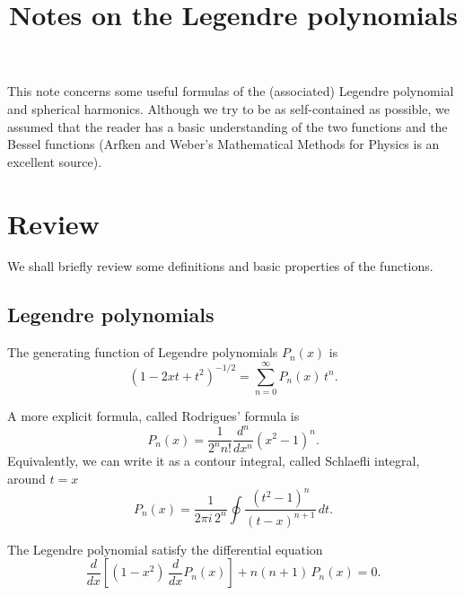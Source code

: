 \documentclass[11pt]{article}
\begin{document}
\title{Notes on the Legendre polynomials}
\author{ \vspace{-10ex} }
\date{ \vspace{-10ex} }
\maketitle


This note concerns some useful formulas of
the (associated) Legendre polynomial
and spherical harmonics.
%
Although we try to be as self-contained as possible,
we assumed that the reader
has a basic understanding of the two functions
and the Bessel functions
(Arfken and Weber's Mathematical Methods for Physics\cite{arfken}
is an excellent source).



\section{Review}



We shall briefly review some definitions and basic properties of the functions.


\subsection{Legendre polynomials}



The generating function of Legendre polynomials $P_n(x)$ is
%
\begin{equation}
  (1 - 2 x t + t^2)^{-1/2}
=
  \sum_{n = 0}^\infty P_n(x) \, t^n.
  \label{eq:legendre_gf}
\end{equation}

A more explicit formula, called Rodrigues' formula is
%
\begin{equation}
  P_n(x)
=
  \frac{1}{2^n n!}
  \frac{d^n}{dx^n}
  (x^2 - 1)^n.
  \label{eq:legendre_rodrigues}
\end{equation}
%
Equivalently, we can write it as a contour integral,
called Schlaefli integral, around $t = x$
\begin{equation}
  P_n(x)
=
  \frac{1}{2\pi i \, 2^n}
  \oint
  \frac{ (t^2 - 1)^n } { (t - x)^{n+1} } \, dt.
  \label{eq:legendre_schlaefli}
\end{equation}


The Legendre polynomial satisfy the differential equation
\begin{equation}
  \frac{d}{dx}
  \left[
    (1 - x^2) \, \frac{d}{dx} P_n(x)
  \right]
+ n (n + 1) \, P_n(x) = 0.
\label{eq:legendre_diffeq}
\end{equation}
\end{document}
